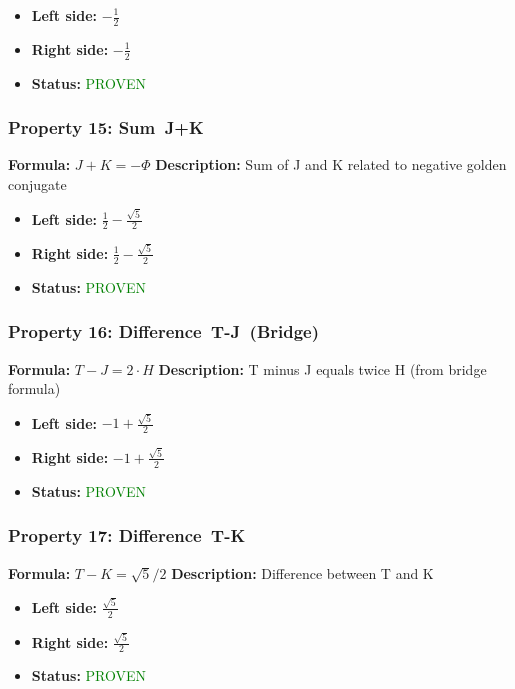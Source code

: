 \begin{itemize}
\item \textbf{Left side:} $- \frac{1}{2}$
\item \textbf{Right side:} $- \frac{1}{2}$
\item \textbf{Status:} \textcolor{green}{PROVEN}
\end{itemize}

\subsubsection*{Property 15: Sum~J+K}
\textbf{Formula:} $J + K = -\Phi$
\textbf{Description:} Sum of J and K related to negative golden conjugate

\begin{itemize}
\item \textbf{Left side:} $\frac{1}{2} - \frac{\sqrt{5}}{2}$
\item \textbf{Right side:} $\frac{1}{2} - \frac{\sqrt{5}}{2}$
\item \textbf{Status:} \textcolor{green}{PROVEN}
\end{itemize}

\subsubsection*{Property 16: Difference~T-J~(Bridge)}
\textbf{Formula:} $T - J = 2 \cdot H$
\textbf{Description:} T minus J equals twice H (from bridge formula)

\begin{itemize}
\item \textbf{Left side:} $-1 + \frac{\sqrt{5}}{2}$
\item \textbf{Right side:} $-1 + \frac{\sqrt{5}}{2}$
\item \textbf{Status:} \textcolor{green}{PROVEN}
\end{itemize}

\subsubsection*{Property 17: Difference~T-K}
\textbf{Formula:} $T - K = \sqrt{5}/2$
\textbf{Description:} Difference between T and K

\begin{itemize}
\item \textbf{Left side:} $\frac{\sqrt{5}}{2}$
\item \textbf{Right side:} $\frac{\sqrt{5}}{2}$
\item \textbf{Status:} \textcolor{green}{PROVEN}
\end{itemize}



